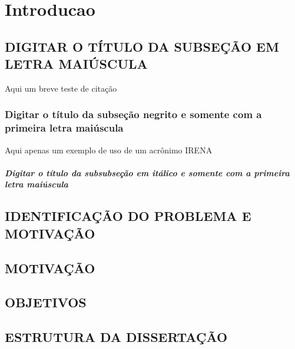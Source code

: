 \chapter{Introducao}\label{cap:ch1}  



\section{DIGITAR O TÍTULO DA SUBSEÇÃO EM LETRA MAIÚSCULA}\label{sec:ch1.1}

Aqui um breve teste de citação \cite{basso2004ieee}

\subsection{\textbf{Digitar o título da subseção negrito e somente com a primeira letra maiúscula}}\label{subsec:ch1.1.1}

Aqui apenas um exemplo de uso de um acrônimo \ac{IRENA}

\subsubsection{\textit{Digitar o título da subsubseção em itálico e somente com a primeira letra maiúscula}}\label{subsubsec:ch1.1.1.1}


\section{IDENTIFICAÇÃO DO PROBLEMA E MOTIVAÇÃO}\label{sec:ch1.2}

\section{MOTIVAÇÃO}\label{sec:ch1.3}


\section{OBJETIVOS}\label{sec:ch1.4}

\section{ESTRUTURA DA DISSERTAÇÃO}\label{sec:ch1.5}

